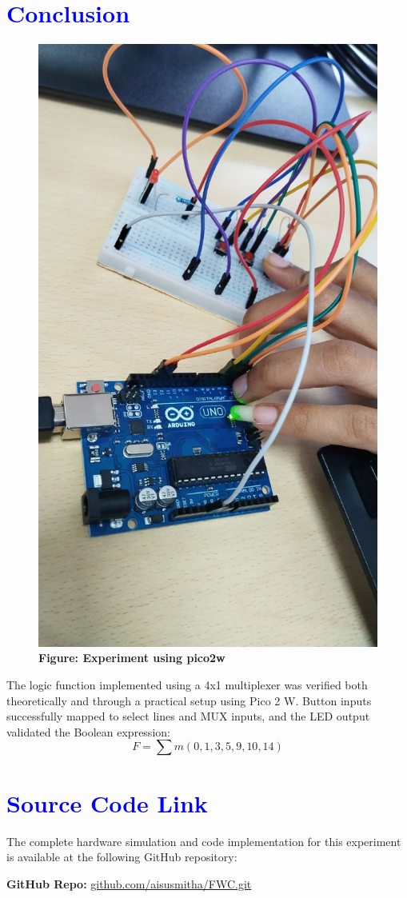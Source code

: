 \documentclass[twocolumn]{article}
\begin{document}
\section*{\textcolor{blue}{Conclusion}}
\begin{figure}
    \centering
    \includegraphics[width=0.95\linewidth]{ec39.jpg}
        \caption*{\textbf{Figure: Experiment using pico2w}}
\end{figure}
The logic function implemented using a 4x1 multiplexer was verified both theoretically and through a practical setup using Pico 2 W. Button inputs successfully mapped to select lines and MUX inputs, and the LED output validated the Boolean expression:
\[
F = \sum m(0,1,3,5,9,10,14)
\]

\section*{\textcolor{blue}{Source Code Link}}
The complete hardware simulation and code implementation for this experiment is available at the following GitHub repository:

\textbf{GitHub Repo:} \href{https://github.com/aisusmitha/FWC.git}{github.com/aisusmitha/FWC.git}
\end{document}
